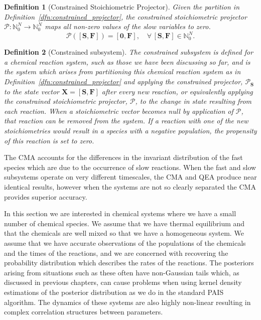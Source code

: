 \documentclass[final]{siamltex}
\newtheorem{dfn}{Definition}[section]
\begin{document}
\begin{dfn}[Constrained Stoichiometric Projector]
	Given the partition in Definition~\ref{dfn:constrained_projector}, the constrained stoichiometric projector $\mathcal{P}\colon\mathbb{N}_0^{N}\rightarrow\mathbb{N}_0^{N}$ maps all non-zero values of the slow variables to zero.
\[
	\mathcal{P}([\mathbf{S}, \mathbf{F}]) = [\mathbf{0}, \mathbf{F}], \quad \forall \, [\mathbf{S}, \mathbf{F}] \in \mathbb{N}_0^{N}.
\]
\end{dfn}

\begin{dfn}[Constrained subsystem]
	The constrained subsystem is defined for a chemical reaction system, such as those we have been discussing so far, and is the system which arises from partitioning this chemical reaction system as in Definition~\ref{dfn:constrained_projector} and applying the constrained projector, $\mathcal{P}_\mathbf{S}$ to the state vector $\mathbf{X} = [\mathbf{S}, \mathbf{F}]$ after every new reaction, or equivalently applying the constrained stoichiometric projector, $\mathcal{P}$, to the change in state resulting from each reaction. When a stoichiometric vector becomes null by application of $\mathcal{P}$, that reaction can be removed from the system. If a reaction with one of the new stoichiometries would result in a species with a negative population, the propensity of this reaction is set to zero.
\end{dfn}

The CMA accounts for the differences in the invariant distribution of the fast species which are due to the occurrence of slow reactions. When the fast and slow subsystems operate on very different timescales, the CMA and QEA produce near identical results, however when the systems are not so clearly separated the CMA provides superior accuracy. 

In this section we are interested in chemical systems where we have a small number of chemical species. We assume that we have thermal equilibrium and that the chemicals are well mixed so that we have a homogeneous system. We assume that we have accurate observations of the populations of the chemicals and the times of the reactions, and we are concerned with recovering the probability distribution which describes the rates of the reactions. The posteriors arising from situations such as these often have non-Gaussian tails which, as discussed in previous chapters, can cause problems when using kernel density estimations of the posterior distribution as we do in the standard PAIS algorithm. The dynamics of these systems are also highly non-linear resulting in complex correlation structures between parameters.
\end{document}
